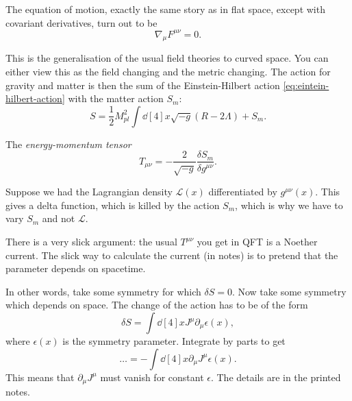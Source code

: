 The equation of motion, exactly the same story as in flat space, except with covariant derivatives, turn out to be
\begin{equation}
  \nabla_{\mu} F^{\mu\nu} = 0.
\end{equation}

This is the generalisation of the usual field theories to curved space.
You can either view this as the field changing and the metric changing.
The action for gravity and matter is then the sum of the Einstein-Hilbert action \eqref{eq:eintein-hilbert-action} with the matter action $S_m$:
\begin{equation}
  S = \frac{1}{2} M_{pl}^2 \int \dd[4]{x} \sqrt{-g} (R - 2 \Lambda) + S_m.
\end{equation}

\begin{definition}[]
  The \emph{energy-momentum tensor}
  \begin{equation}
    T_{\mu\nu} = - \frac{2}{\sqrt{-g}} \frac{\delta S_m}{\delta g^{\mu\nu}}.
  \end{equation}
\end{definition}
\begin{leftbar}
  \begin{note}
    Suppose we had the Lagrangian density $\mathcal{L}(x)$ differentiated by $g^{\mu\nu}(x)$. This gives a delta function, which is killed by the action $S_m$, which is why we have to vary  $S_m$ and not $\mathcal{L}$.
  \end{note}
\end{leftbar}
\begin{remark}
  There is a very slick argument: the usual $T^{\mu\nu}$ you get in QFT is a Noether current. The slick way to calculate the current (in notes) is to pretend that the parameter depends on spacetime.

  In other words, take some symmetry for which $\delta S = 0$. Now take some symmetry which depends on space. The change of the action has to be of the form
   \begin{equation}
     \delta S = \int \dd[4]{x} J^{\mu} \partial_{\mu} \epsilon(x),
  \end{equation}
  where $\epsilon(x)$ is the symmetry parameter. Integrate by parts to get
  \begin{equation}
    \dots = - \int \dd[4]{x} \partial_{\mu} J^{\mu} \epsilon (x).
  \end{equation}
  This means that $\partial_{\mu} J^{\mu}$ must vanish for constant $\epsilon$.
  The details are in the printed notes.
\end{remark}

